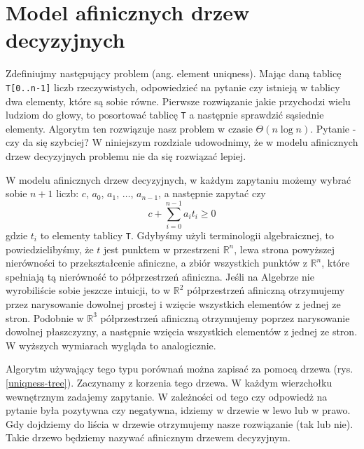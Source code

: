 \section{Model afinicznych drzew decyzyjnych}

\label{sec:elementuniqness}

Zdefiniujmy następujący problem (ang. element uniqness).
Mając daną tablicę \texttt{T[0..n-1]} liczb rzeczywistych, odpowiedzieć na pytanie czy istnieją w tablicy dwa elementy, które są sobie równe.
Pierwsze rozwiązanie jakie przychodzi wielu ludziom do głowy, to posortować tablicę \texttt{T} a następnie sprawdzić sąsiednie elementy.
Algorytm ten rozwiązuje nasz problem w czasie $\Theta(n \log n)$.
Pytanie - czy da się szybciej?
W niniejszym rozdziale udowodnimy, że w modelu afinicznych drzew decyzyjnych problemu nie da się rozwiązać lepiej.

W modelu afinicznych drzew decyzyjnych, w każdym zapytaniu możemy wybrać sobie $n+1$ liczb: $c$, $a_0$, $a_1$, $\dots$, $a_{n-1}$, a następnie zapytać czy
\[
 c + \sum_{i=0}^{n-1} a_i t_i \geq 0
\]
gdzie $t_i$ to elementy tablicy \texttt{T}.
Gdybyśmy użyli terminologii algebraicznej, to powiedzielibyśmy, że $t$ jest punktem w przestrzeni $\mathbb{R}^n$, lewa strona powyższej nierówności to przekształcenie afiniczne,
a zbiór wszystkich punktów z $\mathbb{R}^n$, które spełniają tą nierówność to półprzestrzeń afiniczna.
Jeśli na Algebrze nie wyrobiliście sobie jeszcze intuicji, to w $\mathbb{R}^2$ półprzestrzeń afiniczną otrzymujemy przez narysowanie dowolnej prostej i wzięcie wszystkich elementów z jednej ze stron.
Podobnie w $\mathbb{R}^3$ półprzestrzeń afiniczną otrzymujemy poprzez narysowanie dowolnej płaszczyzny, a następnie wzięcia wszystkich elementów z jednej ze stron.
W wyższych wymiarach wygląda to analogicznie.

Algorytm używający tego typu porównań można zapisać za pomocą drzewa (rys. \ref{uniqness-tree}).
Zaczynamy z korzenia tego drzewa.
W każdym wierzchołku wewnętrznym zadajemy zapytanie.
W zależności od tego czy odpowiedż na pytanie była pozytywna czy negatywna, idziemy w drzewie w lewo lub w prawo.
Gdy dojdziemy do liścia w drzewie otrzymujemy nasze rozwiązanie (tak lub nie).
Takie drzewo będziemy nazywać afinicznym drzewem decyzyjnym.

